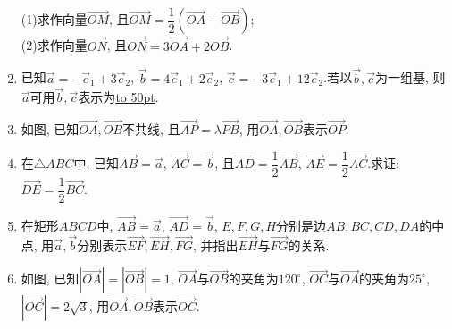\documentclass[10pt,a4paper]{article}
\newcommand{\blank}[1]{\underline{\hbox to #1pt{}}}
\begin{document}
\begin{enumerate}[1.]
\begin{center}
\end{center}
(1)求作向量$\overrightarrow{OM}$, 且$\overrightarrow{OM}=\dfrac 12(\overrightarrow{OA}-\overrightarrow{OB})$;\\
(2)求作向量$\overrightarrow{ON}$, 且$\overrightarrow{ON}=3\overrightarrow{OA}+2\overrightarrow{OB}$.
\item 已知$\overrightarrow a=-\overrightarrow e_1+3\overrightarrow e_2$, $\overrightarrow b=4\overrightarrow e_1+2\overrightarrow e_2$, $\overrightarrow c=-3\overrightarrow e_1+12\overrightarrow e_2$.若以$\overrightarrow b, \overrightarrow c$为一组基, 则$\overrightarrow a$可用$\overrightarrow b,\overrightarrow c$表示为\blank{50}.
\item 如图, 已知$\overrightarrow{OA},\overrightarrow{OB}$不共线, 且$\overrightarrow{AP}=\lambda \overrightarrow{PB}$, 用$\overrightarrow{OA},\overrightarrow{OB}$表示$\overrightarrow{OP}$.
\begin{center}
\end{center}
\item 在$\triangle ABC$中, 已知$\overrightarrow{AB}=\overrightarrow a$, $\overrightarrow{AC}=\overrightarrow b$, 且$\overrightarrow{AD}=\dfrac 12\overrightarrow{AB}$, $\overrightarrow{AE}=\dfrac 12\overrightarrow{AC}$.求证: $\overrightarrow{DE}=\dfrac 12\overrightarrow{BC}$.
\item 在矩形$ABCD$中, $\overrightarrow{AB}=\overrightarrow a$, $\overrightarrow{AD}=\overrightarrow b$, $E,F,G,H$分别是边$AB,BC,CD,DA$的中点, 用$\overrightarrow a,\overrightarrow b$分别表示$\overrightarrow{EF},\overrightarrow{EH},\overrightarrow{FG}$, 并指出$\overrightarrow{EH}$与$\overrightarrow{FG}$的关系.
\item 如图, 已知$|\overrightarrow{OA}|=|\overrightarrow{OB}|=1$, $\overrightarrow{OA}$与$\overrightarrow{OB}$的夹角为$120^{\circ }$, $\overrightarrow{OC}$与$\overrightarrow{OA}$的夹角为$25^{\circ }$, $|\overrightarrow{OC}|=2\sqrt 3$, 用$\overrightarrow{OA},\overrightarrow{OB}$表示$\overrightarrow{OC}$.

\end{enumerate}
\end{document}

